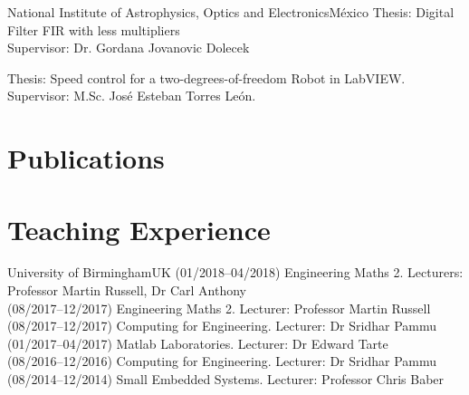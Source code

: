 \documentclass[10pt,a4paper,roman]{moderncv}
\begin{document}
  {National Institute of Astrophysics, Optics and Electronics}{M\'exico}{}
  {Thesis: Digital Filter FIR with less multipliers
  \href{https://github.com/mxochicale/publications/blob/master/Thesis/M.Sc./doc/MPXochicale_MScThesis-2016.pdf}{\faFilePdfO}
  \href{https://github.com/mxochicale/publications/tree/master/Thesis/M.Sc.}{\faGithubAlt}
  \\ Supervisor: Dr. Gordana Jovanovic Dolecek}

  {Thesis: Speed control for a two-degrees-of-freedom Robot in LabVIEW.
  \href{https://github.com/mxochicale/publications/blob/master/Thesis/B.Eng./doc/MPXochicale_BachelorEngThesis-2003.pdf}{\faFilePdfO}
  \href{https://github.com/mxochicale/publications/tree/master/Thesis/B.Eng.}{\faGithubAlt}
  \\ Supervisor: M.Sc. Jos\'e Esteban Torres Le\'on.}


\section{Publications}







\newpage
\section{Teaching Experience}

{University of Birmingham}{UK}{}
{
(01/2018--04/2018) Engineering Maths 2. Lecturers: Professor Martin Russell, Dr Carl Anthony \\
(08/2017--12/2017) Engineering Maths 2. Lecturer: Professor Martin Russell \\
(08/2017--12/2017) Computing for Engineering. Lecturer: Dr Sridhar Pammu \\
(01/2017--04/2017) Matlab Laboratories. Lecturer: Dr Edward Tarte \\
(08/2016--12/2016) Computing for Engineering. Lecturer: Dr Sridhar Pammu \\
(08/2014--12/2014) Small Embedded Systems. Lecturer: Professor Chris Baber
}
\end{document}

